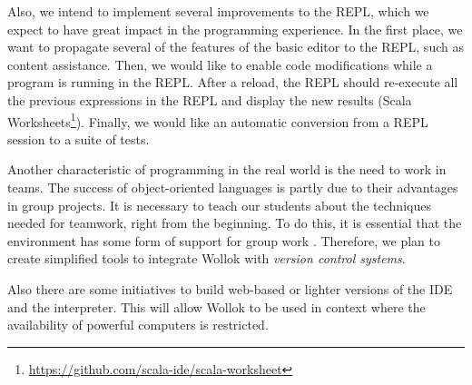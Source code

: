 Also, we intend to implement several improvements to the REPL, which we expect to have great impact in the programming experience.
In the first place, we want to propagate several of the features of the basic editor to the REPL, such as content assistance.
Then, we would like to enable code modifications while a program is running in the REPL.
After a reload, the REPL should re-execute all the previous expressions in the REPL and display the new results (\cf Scala Worksheets\footnote{\url{https://github.com/scala-ide/scala-worksheet}}).
Finally, we would like an automatic conversion from a REPL session to a suite of tests.

Another characteristic of programming in the real world is the need to work in teams. 
The success of object-oriented languages is partly due to their advantages in group projects. 
It is necessary to teach our students about the techniques needed for teamwork, right from the beginning. 
To do this, it is essential that the environment has some form of support for group work \cite{kolling_problem_1999}.
Therefore, we plan to create simplified tools to integrate Wollok with \emph{version control systems}.

Also there are some initiatives to build web-based or lighter versions of the IDE and the interpreter.
This will allow Wollok to be used in context where the availability of powerful computers is restricted.
